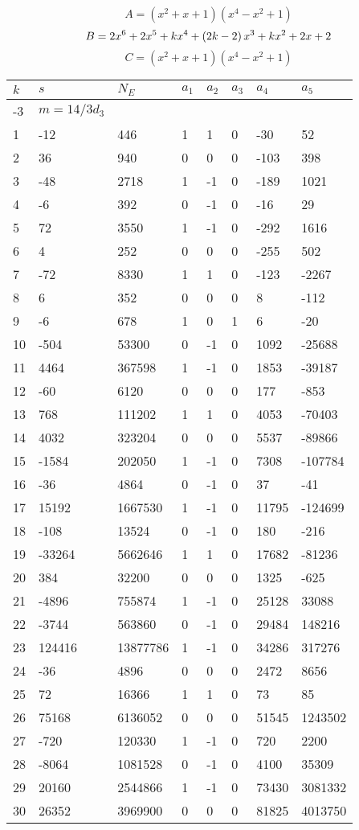 \documentclass{amsart}
\begin{document}
$$A=(x^2
 + x
 + 1)(x^4
 - x^2
 + 1)$$
$$B=2\*x^6
 + 2\*x^5
 + k\*x^4
 + \left(2\*k
 - 2\right) \*x^3
 + k\*x^2
 + 2\*x
 + 2$$
$$C=(x^2
 + x
 + 1)(x^4
 - x^2
 + 1)$$
\begin{longtable}{|l|l|l|lllll|}
\hline
$k$ & $s$ & $N_E$ & $a_1$ & $a_2$ & $a_3$ & $a_4$ & $a_5$\\
\hline
-3&$m=14/3d_{3}$&&\multicolumn{5}{c|}{}\\
1&-12&446&1&1&0&-30&52\\
2&36&940&0&0&0&-103&398\\
3&-48&2718&1&-1&0&-189&1021\\
4&-6&392&0&-1&0&-16&29\\
5&72&3550&1&-1&0&-292&1616\\
6&4&252&0&0&0&-255&502\\
7&-72&8330&1&1&0&-123&-2267\\
8&6&352&0&0&0&8&-112\\
9&-6&678&1&0&1&6&-20\\
10&-504&53300&0&-1&0&1092&-25688\\
11&4464&367598&1&-1&0&1853&-39187\\
12&-60&6120&0&0&0&177&-853\\
13&768&111202&1&1&0&4053&-70403\\
14&4032&323204&0&0&0&5537&-89866\\
15&-1584&202050&1&-1&0&7308&-107784\\
16&-36&4864&0&-1&0&37&-41\\
17&15192&1667530&1&-1&0&11795&-124699\\
18&-108&13524&0&-1&0&180&-216\\
19&-33264&5662646&1&1&0&17682&-81236\\
20&384&32200&0&0&0&1325&-625\\
21&-4896&755874&1&-1&0&25128&33088\\
22&-3744&563860&0&-1&0&29484&148216\\
23&124416&13877786&1&-1&0&34286&317276\\
24&-36&4896&0&0&0&2472&8656\\
25&72&16366&1&1&0&73&85\\
26&75168&6136052&0&0&0&51545&1243502\\
27&-720&120330&1&-1&0&720&2200\\
28&-8064&1081528&0&-1&0&4100&35309\\
29&20160&2544866&1&-1&0&73430&3081332\\
30&26352&3969900&0&0&0&81825&4013750\\

\end{longtable}
\end{document}

